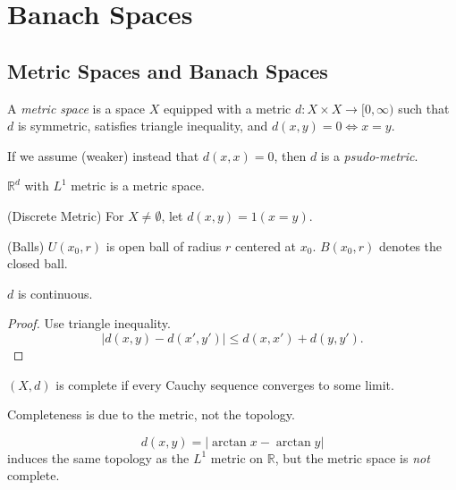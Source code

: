 
\section{Banach Spaces}



\subsection{Metric Spaces and Banach Spaces}


\begin{definition}
	A \textit{metric space} is a space $X $ equipped with a metric $d: X \times  X \to [0, \infty )$ such that $d$ is symmetric, satisfies triangle inequality, and $d(x, y) = 0 \iff x = y$.

	If we assume (weaker) instead that $d(x, x) = 0$, then $d$ is a \textit{psudo-metric}.
\end{definition}

\begin{example}
	$\mathbb{R}^d$ with $L^1$ metric is a metric space.
\end{example}

\begin{example}(Discrete Metric)
	For $X \neq \emptyset $, let $d(x, y) = 1(x = y)$.
\end{example}

\begin{definition}(Balls)
	$U(x_0, r)$ is open ball of radius $r$ centered at $x_0$. $B(x_0, r)$ denotes the closed ball.
\end{definition}

\begin{lemma}
	$d$ is continuous.
\end{lemma}
\begin{proof}
	Use triangle inequality.
	\[
		\left| d (x, y) - d(x', y') \right| 
		\le  d(x, x') + d (y, y')
	.\] 
\end{proof}

\begin{definition}
	$(X, d)$ is complete if every Cauchy sequence converges to some limit.
\end{definition}

Completeness is due to the metric, not the topology.
\begin{example}
	\[
		d(x,y) = \left| \arctan x - \arctan  y \right| 
\] 
induces the same topology as the $L^1 $ metric on $\mathbb{R}$, but the metric space is \textit{not} complete.
\end{example}

